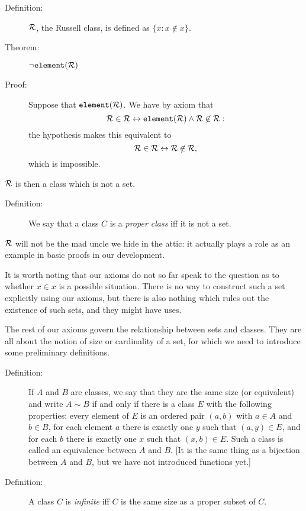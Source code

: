 \documentclass[12pt]{article}
\begin{document}
\begin{description}

\item[Definition:]  $\cal R$, the Russell class, is defined as $\{x:x \not\in x\}$.

\item[Theorem:]  $\neg {\tt element}(\cal R)$ 

\item[Proof:]  Suppose that ${\tt element}(\cal R)$.  We have by axiom that $$\cal R \in \cal R \leftrightarrow {\tt element}(\cal R) \wedge \cal R \not\in \cal R:$$ the hypothesis makes this equivalent to
$$\cal R \in \cal R \leftrightarrow \cal R \not\in\cal  R,$$ which is impossible.

\end{description}

$\cal R$ is then a class which is not a set.
\begin{description}
\item[Definition:]  We say that a class $C$ is a {\em proper class\/} iff it is not a set.
\end{description}

$\cal R$ will not be the mad uncle we hide in the attic:  it actually plays a role as an example in basic proofs in our development.

It is worth noting that our axioms do not so far speak to the question as to whether $x \in x$ is a possible situation.  There is no way to construct such a set explicitly using our axioms, but there is also nothing which rules out the existence of such sets, and they might have uses.

The rest of our axioms govern the relationship between sets and classes.  They are all about the notion of size or cardinality of a set, for which we need to introduce some preliminary definitions.

\begin{description}





\item[Definition:]  If $A$ and $B$ are classes, we say that they are the same size (or equivalent)  and write $A \sim B$  if and only if there is a class $E$ with the following properties:  every element of $E$ is an ordered pair $(a,b)$ with $a \in A$ and $b \in B$, for each element $a$ there is exactly one $y$ such that $(a,y) \in E$, and for each $b$ there is exactly one $x$ such that $(x,b) \in E$.  Such a class is called an equivalence between $A$ and $B$.  [It is the same thing as a bijection between $A$ and $B$, but we have not introduced functions yet.]



\item[Definition:]  A class $C$ is {\em infinite\/} iff $C$ is the same size as a proper subset of $C$.

\end{description}
\end{document}
